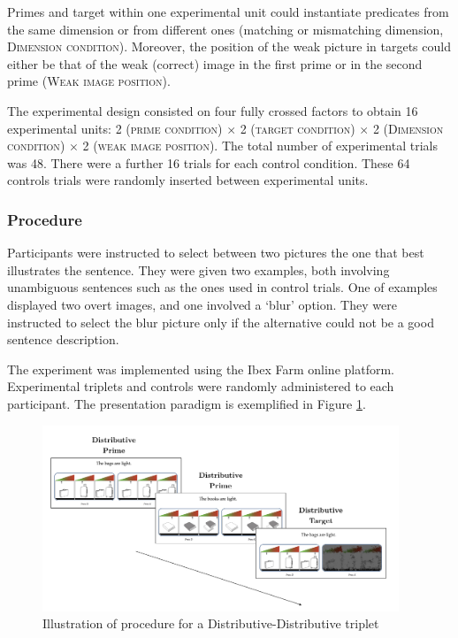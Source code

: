\documentclass[a4paper, 11pt]{article}
\begin{document}
Primes and target within one experimental unit could instantiate predicates from the same dimension or from different ones (matching or mismatching dimension, \textsc{Dimension condition}). Moreover, the position of the weak picture in targets could either be that of the weak (correct) image in the first prime or in the second prime (\textsc{Weak image position}).

The experimental design consisted on four fully crossed factors to obtain 16 experimental units: 2 (\textsc{prime condition}) $\times$  2 (\textsc{target condition}) $\times$ 2 (\textsc{Dimension condition}) $\times$ 2 (\textsc{weak image position}). The total number of experimental trials was 48. There were a further 16 trials for each control condition. These 64 controls trials were randomly inserted between experimental units.


\subsubsection{Procedure}
Participants were instructed to select between two pictures the one that best illustrates the sentence. 
They were given two examples, both involving unambiguous sentences such as the ones used in control trials. One of examples displayed two overt images, and one involved a `blur' option. They were instructed to select the blur picture only if the alternative could not be a good sentence description.

The experiment was implemented using the Ibex Farm online platform. Experimental triplets and controls were randomly administered to each participant. The presentation paradigm is exemplified in Figure \ref{fig:procedure}.


\begin{figure}[h!]
  \centering
    \includegraphics[width=0.95\textwidth]{procedure.jpeg}
      \caption{Illustration of procedure for a Distributive-Distributive triplet}
      \label{fig:procedure}
\end{figure}
\end{document}

